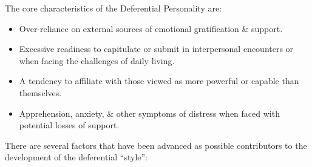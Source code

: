 \documentclass{article}
\numberwithin{equation}{section}
\begin{document}
The core characteristics of the Deferential Personality are:
\begin{itemize}
	\item Over-reliance on external sources of emotional gratification \& support.
	\item Excessive readiness to capitulate or submit in interpersonal encounters or when facing the challenges of daily living.
	\item A tendency to affiliate with those viewed as more powerful or capable than themselves.
	\item Apprehension, anxiety, \& other symptoms of distress when faced with potential losses of support.
\end{itemize}
There are several factors that have been advanced as possible contributors to the development of the deferential ``style'':
\end{document}
